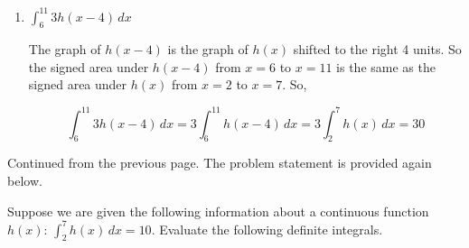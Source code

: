 \documentclass{article}
\begin{document}
\begin{enumerate}
\begin{enumerate}
\begin{solution}
        We can visualize $\displaystyle\int_{2}^{7} 6 \, dx$ as the following signed area:

        \begin{center}
          \end{center}

        So we have 
        \begin{align*}
            \displaystyle\int_{2}^{7} \Big[\frac{\pi h(x)}{5} +6\Big] \,dx &= \frac{\pi}{5} \left (10\right ) + 30 \\
            &= \boxed{2\pi + 30} \\
        \end{align*}
    
    \end{solution}

    
    \item
    \begin{problem}
    $\displaystyle\int_{6}^{11} 3h(x-4) \,dx$
    \end{problem}
    \pspace{\vfill}
    
    \begin{solution}
        The graph of $h(x-4)$ is the graph of $h(x)$ shifted to the right 4 units. So the signed area under $h(x-4)$ from $x=6$ to $x=11$ is the same as the signed area under $h(x)$ from $x=2$ to $x=7$. So,

        \[\displaystyle\int_{6}^{11} 3h(x-4) \,dx = 3\displaystyle\int_{6}^{11} h(x-4) \,dx = 3\displaystyle\int_{2}^{7} h(x) \,dx = \boxed{30}\]
    \end{solution}
\end{enumerate}
\newpage 

\begin{framed}
        Continued from the previous page. The problem statement is provided again below.
    
Suppose we are given the following information about a continuous function $h(x)$: $\displaystyle\int_{2}^{7} h(x) \,dx =10$. 
Evaluate the following definite integrals.
    \end{framed}


\end{enumerate}
\end{document}
